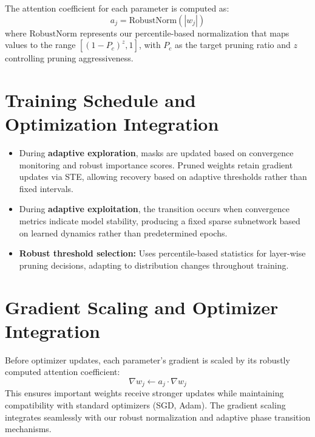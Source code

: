 \documentclass[12pt,a4paper]{report}
\begin{document}
The attention coefficient for each parameter is computed as:
\[
a_j = \text{RobustNorm}(|w_j|)
\]
where $\text{RobustNorm}$ represents our percentile-based normalization that maps values to the range $[(1-P_c)^z, 1]$, with $P_c$ as the target pruning ratio and $z$ controlling pruning aggressiveness.

\section{Training Schedule and Optimization Integration}
\begin{itemize}
    \item During \textbf{adaptive exploration}, masks are updated based on convergence monitoring and robust importance scores. Pruned weights retain gradient updates via STE, allowing recovery based on adaptive thresholds rather than fixed intervals.
    \item During \textbf{adaptive exploitation}, the transition occurs when convergence metrics indicate model stability, producing a fixed sparse subnetwork based on learned dynamics rather than predetermined epochs.
    \item \textbf{Robust threshold selection:} Uses percentile-based statistics for layer-wise pruning decisions, adapting to distribution changes throughout training.
\end{itemize}

\section{Gradient Scaling and Optimizer Integration}
Before optimizer updates, each parameter's gradient is scaled by its robustly computed attention coefficient:
\[
\nabla w_j \leftarrow a_j \cdot \nabla w_j
\]
This ensures important weights receive stronger updates while maintaining compatibility with standard optimizers (SGD, Adam). The gradient scaling integrates seamlessly with our robust normalization and adaptive phase transition mechanisms.
\end{document}
